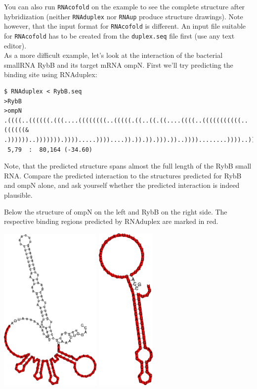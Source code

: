 \documentclass[]{article}
\begin{document}
You can also run \texttt{RNAcofold} on the example to see the complete
structure after hybridization (neither \texttt{RNAduplex} nor
\texttt{RNAup} produce structure drawings). Note however, that the input
format for \texttt{RNAcofold} is different. An input file suitable for
\texttt{RNAcofold} has to be created from the \texttt{duplex.seq} file
first (use any text editor).\\
 As a more difficult example, let's look at the interaction of the
bacterial smallRNA RybB and its target mRNA ompN. First we'll try
predicting the binding site using RNAduplex:

\begin{verbatim}
$ RNAduplex < RybB.seq
>RybB
>ompN
.((((..((((((.(((....((((((((..(((((.((..((.((....((((..(((((((((((..((((((&
.))))))..))))))).)))).....))))....)).)).)).))).))..))))........))))..))).)))))).)))).
 5,79  :  80,164 (-34.60)
\end{verbatim}

Note, that the predicted structure spans almost the full length of the
RybB small RNA. Compare the predicted interaction to the structures
predicted for RybB and ompN alone, and ask yourself whether the
predicted interaction is indeed plausible.

Below the structure of ompN on the left and RybB on the right side. The
respective binding regions predicted by RNAduplex are marked in red.

\includegraphics{Figs/ompN_ss.png}
\includegraphics{Figs/RybB_ss.png}
\end{document}
